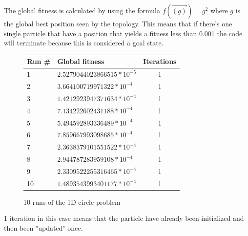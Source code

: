 \documentclass[12pt, a4paper]{article}
\begin{document}
The global fitness is calculated by using the formula $f(\vec{(g)})=g^2$ where $g$ is the global best position seen by the topology. This means that if there's one single particle that have a position that yields a fitness less than 0.001 the code will terminate because this is considered a goal state.
\begin{figure}[H]
\begin{center}
\begin{tabular}{l| l  c}
Run \# & Global fitness& Iterations\\ \hline
1&$2.5279044023866515*10^{-5}$ & 1 \\
2&$3.664100719971322*10^{-4}$ & 1 \\
3&$1.4212923947371634*10^{-4}$ & 1 \\
4&$7.134222602431188*10^{-4}$ & 1 \\
5&$5.494592893336489*10^{-4}$ & 1 \\
6&$7.859667993098685*10^{-4}$ & 1 \\
7&$2.3638379101551522*10^{-4}$ & 1 \\
8&$2.944787283959108*10^{-4}$ & 1 \\
9&$2.3309522255316465*10^{-4}$ & 1 \\
10&$1.4893543993401177*10^{-4}$ & 1 \\
\end{tabular}
\caption{10 runs of the 1D circle problem}
\end{center}
\end{figure}
1 iteration in this case means that the particle have already been initialized and then been "updated" once.
\end{document}

